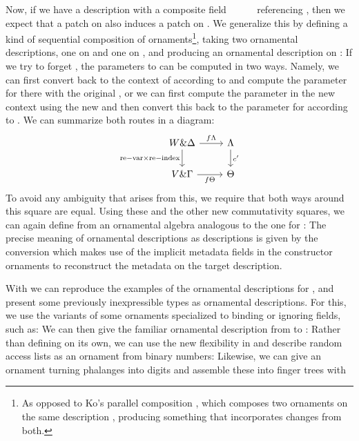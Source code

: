 Now, if we have a description  with a composite field \ \ \ \ \  referencing , then we expect that a patch on  also induces a patch on . We generalize this by defining a kind of sequential composition of ornaments\footnote{As opposed to Ko's parallel composition \cite{kophd}, which composes two ornaments on the same description , producing something that incorporates changes from both.}, taking two ornamental descriptions, one on  and one on , and producing an ornamental description on :
If we try to forget , the parameters to  can be computed in two ways. Namely, we can first convert back to the context of  according to  and compute the parameter for  there with the original , or we can first compute the parameter in the new context using the new  and then convert this back to the parameter for  according to . We can summarize both routes in a diagram:  
\[\begin{tikzcd}
	{W \& \Delta} & \Lambda \\
	{V\& \Gamma} & \Theta
	\arrow["{\mathrm{re-var}\times\mathrm{re-index}}"', from=1-1, to=2-1]
	\arrow["f\Lambda", from=1-1, to=1-2]
	\arrow["f\Theta"', from=2-1, to=2-2]
	\arrow["{c'}", from=1-2, to=2-2]
\end{tikzcd}\]
To avoid any ambiguity that arises from this, we require that both ways around this square are equal. Using these and the other new commutativity squares, we can again define  from an ornamental algebra analogous to the one for :
The precise meaning of ornamental descriptions as descriptions is given by the conversion
which makes use of the implicit metadata fields in the constructor ornaments to reconstruct the metadata on the target description.

With  we can reproduce the examples of the ornamental descriptions for , and present some previously inexpressible types as ornamental descriptions. For this, we use the variants of some ornaments specialized to binding or ignoring fields, such as:
We can then give the familiar ornamental description from  to :
Rather than defining  on its own, we can use the new flexibility in  and describe random access lists as an ornament from binary numbers:
Likewise, we can give an ornament turning phalanges into digits
and assemble these into finger trees with 
